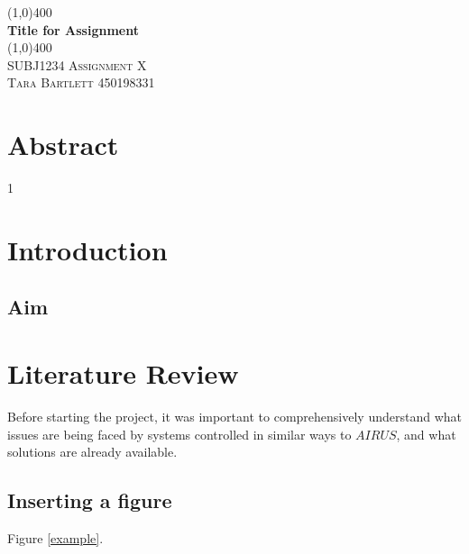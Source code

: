 \documentclass{article}
\begin{document}
\begin{titlepage}
	
\end{titlepage}
\cleardoublepage	
\begin{titlepage}
	\begin{center}
		
		\vspace{2cm}
		\line(1,0){400}\\
		[1cm]
		\huge{\bfseries Title for Assignment}\\
		[2mm]
		\line(1,0){400}\\
		[1.5cm]
		\textsc{\LARGE SUBJ1234 Assignment X}\\
	\vspace{11.75cm}
		\textsc{\large Tara Bartlett 450198331}
	\end{center}
\end{titlepage}


\section{Abstract}

\tableofcontents
\cleardoublepage


\setcounter{page}1

\newpage{}

\section{Introduction}

\subsection{Aim}

\newpage{}
\section{Literature Review}
Before starting the project, it was important to comprehensively understand what issues are being faced by systems controlled in similar ways to $AIRUS$, and what solutions are already available.

\subsection{Inserting a figure} Figure \ref{example}.
\end{document}
